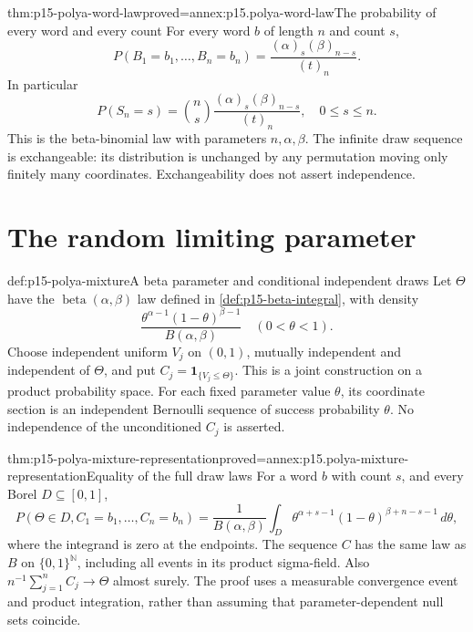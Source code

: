 \begin{hbtheorem}{thm:p15-polya-word-law}{proved=annex:p15.polya-word-law}{The probability of every word and every count}
For every word \(b\) of length \(n\) and count \(s\),
\[
 P(B_1=b_1,\ldots,B_n=b_n)
       =\frac{(\alpha)_s(\beta)_{n-s}}{(t)_n}.
\]
In particular
\[
              P(S_n=s)=\binom ns
                    \frac{(\alpha)_s(\beta)_{n-s}}{(t)_n},
                    \quad 0\leq s\leq n.
\]
This is the beta-binomial law with parameters \(n,\alpha,\beta\).
The infinite draw sequence is exchangeable: its distribution is unchanged
by any permutation moving only finitely many coordinates.
Exchangeability does not assert independence.
\end{hbtheorem}

\section{The random limiting parameter}

\begin{hbdefinition}{def:p15-polya-mixture}{A beta parameter and conditional independent draws}
Let \(\Theta\) have the \(\operatorname{beta}(\alpha,\beta)\) law
defined in \cref{def:p15-beta-integral}, with density
\[
 \frac{\theta^{\alpha-1}(1-\theta)^{\beta-1}}{B(\alpha,\beta)}
                       \quad(0<\theta<1).
\]
Choose independent uniform \(V_j\) on \((0,1)\), mutually independent
and independent of \(\Theta\), and put
\(C_j=\mathbf1_{\{V_j\leq\Theta\}}\).
This is a joint construction on a product probability space.
For each fixed parameter value \(\theta\), its coordinate section
is an independent Bernoulli sequence of success probability \(\theta\).
No independence of the unconditioned \(C_j\) is asserted.
\end{hbdefinition}

\begin{hbtheorem}{thm:p15-polya-mixture-representation}{proved=annex:p15.polya-mixture-representation}{Equality of the full draw laws}
For a word \(b\) with count \(s\), and every Borel \(D\subseteq[0,1]\),
\[
 P(\Theta\in D,C_1=b_1,\ldots,C_n=b_n)
 =\frac{1}{B(\alpha,\beta)}
       \int_D\theta^{\alpha+s-1}(1-\theta)^{\beta+n-s-1}\,d\theta,
\]
where the integrand is zero at the endpoints.
The sequence \(C\) has the same law as \(B\) on
\(\{0,1\}^{\mathbb N}\), including all events in its product sigma-field.
Also \(n^{-1}\sum_{j=1}^nC_j\to\Theta\) almost surely.
The proof uses a measurable convergence event and product integration,
rather than assuming that parameter-dependent null sets coincide.
\end{hbtheorem}

